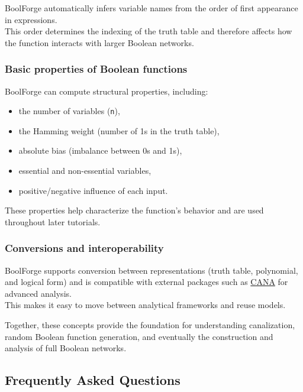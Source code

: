 \documentclass[
]{article}
\providecommand{\tightlist}{%
  \setlength{\itemsep}{0pt}\setlength{\parskip}{0pt}}
\begin{document}
BoolForge automatically infers variable names from the order of first
appearance in expressions.\\
This order determines the indexing of the truth table and therefore
affects how the function interacts with larger Boolean networks.

\subsubsection{Basic properties of Boolean
functions}\label{basic-properties-of-boolean-functions-1}

BoolForge can compute structural properties, including:

\begin{itemize}
\tightlist
\item
  the number of variables (\texttt{n}),
\item
  the Hamming weight (number of 1s in the truth table),
\item
  absolute bias (imbalance between 0s and 1s),
\item
  essential and non-essential variables,
\item
  positive/negative influence of each input.
\end{itemize}

These properties help characterize the function's behavior and are used
throughout later tutorials.

\subsubsection{Conversions and
interoperability}\label{conversions-and-interoperability}

BoolForge supports conversion between representations (truth table,
polynomial, and logical form) and is compatible with external packages
such as \href{https://www.github.com/CASCI-lab/CANA}{CANA} for advanced
analysis.\\
This makes it easy to move between analytical frameworks and reuse
models.

Together, these concepts provide the foundation for understanding
canalization, random Boolean function generation, and eventually the
construction and analysis of full Boolean networks.

\subsection{Frequently Asked
Questions}\label{frequently-asked-questions}
\end{document}
